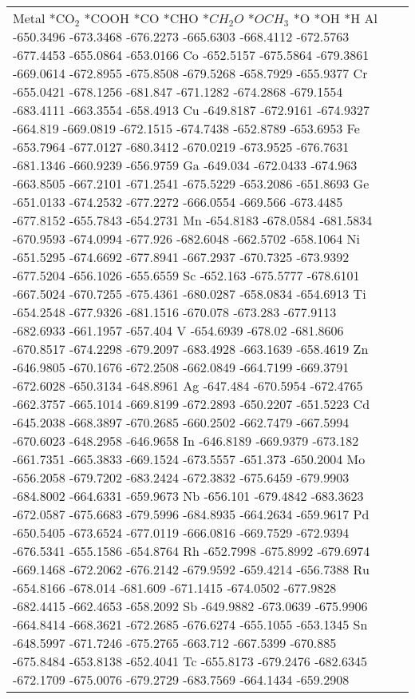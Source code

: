 \begin{table}[h]
    \centering
    \begin{tabular}{lr}
      \hline
      Metal	*CO$_2$	*COOH	*CO	*CHO	*$CH_2O$	*$OCH_3$	*O	*OH	*H
      \hline
      Al	-650.3496	-673.3468	-676.2273	-665.6303	-668.4112	-672.5763	-677.4453	-655.0864	-653.0166
      Co	-652.5157	-675.5864	-679.3861	-669.0614	-672.8955	-675.8508	-679.5268	-658.7929	-655.9377
      Cr	-655.0421	-678.1256	-681.847	-671.1282	-674.2868	-679.1554	-683.4111	-663.3554	-658.4913
      Cu	-649.8187	-672.9161	-674.9327	-664.819	-669.0819	-672.1515	-674.7438	-652.8789	-653.6953
      Fe	-653.7964	-677.0127	-680.3412	-670.0219	-673.9525	-676.7631	-681.1346	-660.9239	-656.9759
      Ga	-649.034	-672.0433	-674.963	-663.8505	-667.2101	-671.2541	-675.5229	-653.2086	-651.8693
      Ge	-651.0133	-674.2532	-677.2272	-666.0554	-669.566	-673.4485	-677.8152	-655.7843	-654.2731
      Mn	-654.8183	-678.0584	-681.5834	-670.9593	-674.0994	-677.926	-682.6048	-662.5702	-658.1064
      Ni	-651.5295	-674.6692	-677.8941	-667.2937	-670.7325	-673.9392	-677.5204	-656.1026	-655.6559
      Sc	-652.163	-675.5777	-678.6101	-667.5024	-670.7255	-675.4361	-680.0287	-658.0834	-654.6913
      Ti	-654.2548	-677.9326	-681.1516	-670.078	-673.283	-677.9113	-682.6933	-661.1957	-657.404
      V	  -654.6939	-678.02		-681.8606	-670.8517	-674.2298	-679.2097	-683.4928	-663.1639	-658.4619
      Zn	-646.9805	-670.1676	-672.2508	-662.0849	-664.7199	-669.3791	-672.6028	-650.3134	-648.8961
      Ag	-647.484	-670.5954	-672.4765	-662.3757	-665.1014	-669.8199	-672.2893	-650.2207	-651.5223
      Cd	-645.2038	-668.3897	-670.2685	-660.2502	-662.7479	-667.5994	-670.6023	-648.2958	-646.9658
      In	-646.8189	-669.9379	-673.182	-661.7351	-665.3833	-669.1524	-673.5557	-651.373	-650.2004
      Mo	-656.2058	-679.7202	-683.2424	-672.3832	-675.6459	-679.9903	-684.8002	-664.6331	-659.9673
      Nb	-656.101	-679.4842	-683.3623	-672.0587	-675.6683	-679.5996	-684.8935	-664.2634	-659.9617
      Pd	-650.5405	-673.6524	-677.0119	-666.0816	-669.7529	-672.9394	-676.5341	-655.1586	-654.8764
      Rh	-652.7998	-675.8992	-679.6974	-669.1468	-672.2062	-676.2142	-679.9592	-659.4214	-656.7388
      Ru	-654.8166	-678.014	-681.609	-671.1415	-674.0502	-677.9828	-682.4415	-662.4653	-658.2092
      Sb	-649.9882	-673.0639	-675.9906	-664.8414	-668.3621	-672.2685	-676.6274	-655.1055	-653.1345
      Sn	-648.5997	-671.7246	-675.2765	-663.712	-667.5399	-670.885	-675.8484	-653.8138	-652.4041
      Tc	-655.8173	-679.2476	-682.6345	-672.1709	-675.0076	-679.2729	-683.7569	-664.1434	-659.2908

\end{tabular}
\end{table}
